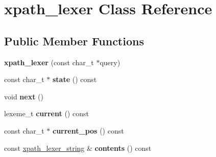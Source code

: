 \hypertarget{classxpath__lexer}{}\section{xpath\+\_\+lexer Class Reference}
\label{classxpath__lexer}
\subsection*{Public Member Functions}
\begin{DoxyCompactItemize}
\item 
\mbox{\label{classxpath__lexer_aa52661c9ba7dfa262d3ab49f578653c3}} 
{\bfseries xpath\+\_\+lexer} (const char\+\_\+t $\ast$query)
\item 
\mbox{\label{classxpath__lexer_a8a753887f59ce7d55f6f9be88fbf4238}} 
const char\+\_\+t $\ast$ {\bfseries state} () const
\item 
\mbox{\label{classxpath__lexer_a32684b3097fccb4d626da620b44b72ad}} 
void {\bfseries next} ()
\item 
\mbox{\label{classxpath__lexer_a47425d5012741aecfd898306651439d0}} 
lexeme\+\_\+t {\bfseries current} () const
\item 
\mbox{\label{classxpath__lexer_a72ab988b8ed95cb22441fdec600a6e58}} 
const char\+\_\+t $\ast$ {\bfseries current\+\_\+pos} () const
\item 
\mbox{\label{classxpath__lexer_a3a0b50cbd97ef5485b82aa53eda850fa}} 
const \hyperlink{structxpath__lexer__string}{xpath\+\_\+lexer\+\_\+string} \& {\bfseries contents} () const
\end{DoxyCompactItemize}
